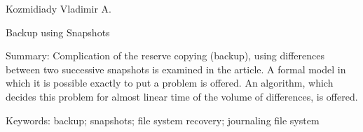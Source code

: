 Kozmidiady Vladimir A.

Backup using Snapshots

Summary: Complication of the reserve copying (backup), using differences
between two successive snapshots is examined in the article. A formal model
in which it is possible exactly to put a problem is offered. An algorithm,
which decides this problem for almost linear time of the volume of
differences, is offered.

Keywords: backup; snapshots; file system recovery; journaling file system